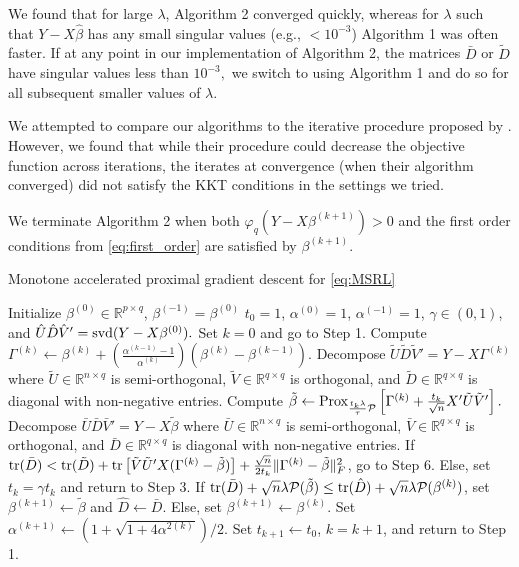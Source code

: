 \documentclass[12pt]{article}
\begin{document}
We found that for large $\lambda$, Algorithm 2 converged quickly, whereas for $\lambda$ such that $Y - X\hat{\beta}$ has any small singular values (e.g., $ < 10^{-3}$) Algorithm 1 was often faster. If at any point in our implementation of Algorithm 2, the matrices $\bar{D}$ or $\tilde{D}$ have singular values less than $10^{-3},$ we switch to using Algorithm 1 and do so for all subsequent smaller values of $\lambda$. 

We attempted to compare our algorithms to the iterative procedure proposed by \citet{van2016chi2}. However, we found that while their procedure could decrease the objective function across iterations, the iterates at convergence (when their algorithm converged) did not satisfy the KKT conditions in the settings we tried. 

We terminate Algorithm 2 when both $\varphi_q(Y - X \beta^{(k+1)}) > 0$ and the first order conditions from \eqref{eq:first_order}
are satisfied by $\beta^{(k+1)}$.

\begin{algorithm}
\caption{Monotone accelerated proximal gradient descent for \eqref{eq:MSRL}}
\begin{spacing}{1.15}
\begin{algorithmic}[1]
\Require Initialize $\beta^{(0)} \in \mathbb{R}^{p \times q}$, $\beta^{(-1)} = \beta^{(0)}$ $t_0=1$, $\alpha^{(0)} = 1$, $\alpha^{(-1)} = 1$, $\gamma \in (0,1)$, and $\hat{U}\hat{D}\hat{V}' = {\rm svd}(Y - X \beta^{(0)}).$ Set $k=0$ and go to Step 1. 
\State Compute $\Gamma^{(k)} \leftarrow \beta^{(k)} + \left(\frac{\alpha^{(k-1)} - 1}{\alpha^{(k)}}\right) \left(\beta^{(k)} - \beta^{(k-1)}\right).$
\State Decompose $\tilde{U}\tilde{D}\tilde{V}' = Y - X \Gamma^{(k)}$ where $\tilde{U} \in \mathbb{R}^{n \times q}$ is semi-orthogonal, $\tilde{V} \in \mathbb{R}^{q \times q}$ is orthogonal, and $\tilde{D} \in \mathbb{R}^{q \times q}$ is diagonal with non-negative entries. 
	\State Compute $\tilde{\beta} \leftarrow {\rm Prox}_{ \frac{t_k\lambda}{\tau} \mathcal{P}} \left[\Gamma^{(k)} + \frac{t_k}{\sqrt{n}}X'\tilde{U}\tilde{V}' \right].$
	\State Decompose $\bar{U}\bar{D}\bar{V}' = Y - X\tilde{\beta}$
	where $\bar{U} \in \mathbb{R}^{n \times q}$ is semi-orthogonal, $\bar{V} \in \mathbb{R}^{q \times q}$ is orthogonal, and $\bar{D} \in \mathbb{R}^{q \times q}$ is diagonal with non-negative entries. 
 	\State If ${\rm tr}(\bar{D})  < {\rm tr}(\tilde{D}) + 
 	{\rm tr}\left[\tilde{V}\tilde{U}'X(\Gamma^{(k)} - \tilde{\beta})\right] + \frac{\sqrt{n}}{2t_k}\|\Gamma^{(k)} - \tilde{\beta}\|_F^2$, go to Step 6. Else, set $t_k = \gamma t_k$ and return to Step 3.
 	\State If ${\rm tr}(\bar{D}) + \sqrt{n}\lambda \mathcal{P}(\tilde{\beta}) \leq {\rm tr}(\hat{D}) + \sqrt{n}\lambda \mathcal{P}(\beta^{(k)})$, set $\beta^{(k+1)} \leftarrow \tilde{\beta}$ and $\hat{D} \leftarrow \bar{D}$. Else, set $\beta^{(k+1)} \leftarrow \beta^{(k)}$. 
 	\State Set $\alpha^{(k+1)} \leftarrow (1 + \sqrt{1 + 4\alpha^{2(k)}})/2.$ 
	\State Set $t_{k+1} \leftarrow t_0$, $k = k + 1$, and return to Step 1. 
\end{algorithmic}
\end{spacing}
\end{algorithm}
\end{document}
